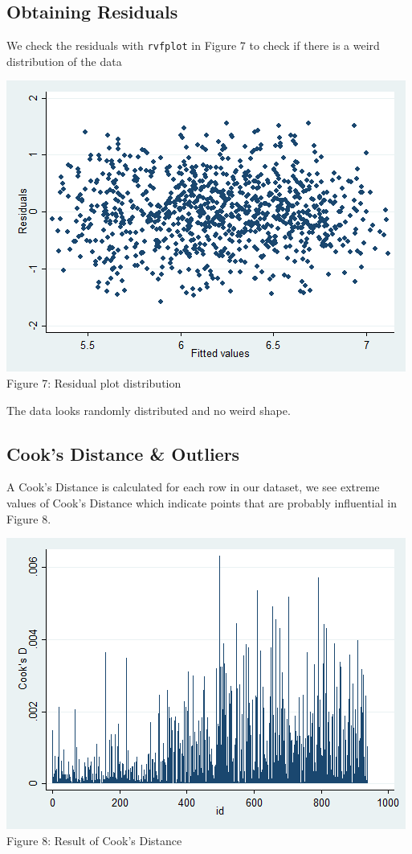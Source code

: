 \documentclass[10pt]{article}
\begin{document}
\subsection{Obtaining Residuals}

We check the residuals with {\tt rvfplot} in Figure 7 to check if there is a weird distribution of the data
\begin{center}
\includegraphics[scale=0.4]{g17.png}\\
Figure 7: Residual plot distribution
\end{center}

The data looks randomly distributed and no weird shape. 

\subsection{Cook's Distance \& Outliers}

A Cook's Distance is calculated for each row in our dataset, we see extreme values of Cook's Distance which indicate points that are probably influential in Figure 8. 

\begin{center}
\includegraphics[scale=0.5]{g18.png}\\
Figure 8: Result of Cook's Distance
\end{center}
\end{document}

